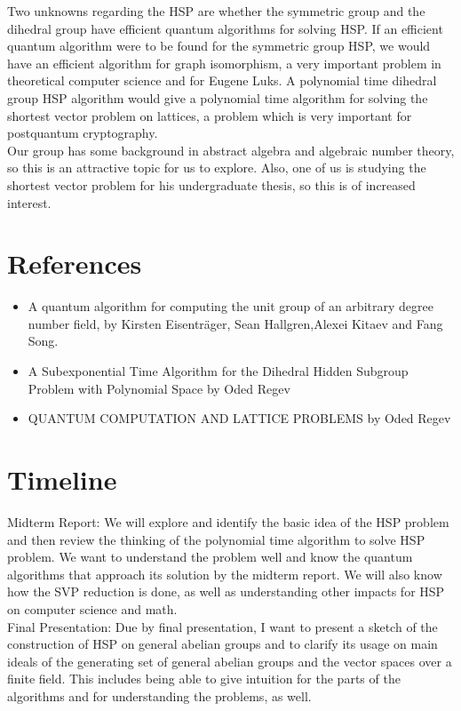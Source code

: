 \documentclass[dvips,12pt]{article}
\theoremstyle{plain}
\theoremstyle{definition}
\begin{document}
Two unknowns regarding the HSP are whether the symmetric group and the dihedral group have efficient quantum algorithms for solving HSP. If an efficient quantum algorithm were to be found for the symmetric group HSP, we would have an efficient algorithm for graph isomorphism, a very important problem in theoretical computer science and for Eugene Luks. A polynomial time dihedral group HSP algorithm would give a polynomial time algorithm for solving the shortest vector problem on lattices, a problem which is very important for postquantum cryptography.\\

Our group has some background in abstract algebra and algebraic number theory, so this is an attractive topic for us to explore. Also, one of us is studying the shortest vector problem for his undergraduate thesis, so this is of increased interest.\\

\section{References}
\begin{itemize}
\item A quantum algorithm for computing the unit group of an
arbitrary degree number field, by Kirsten Eisenträger, Sean Hallgren,Alexei Kitaev and Fang Song.
	
\item A Subexponential Time Algorithm for the Dihedral Hidden Subgroup Problem with Polynomial Space                                        by Oded Regev
	
	
\item QUANTUM COMPUTATION AND LATTICE PROBLEMS by Oded Regev 
	
\end{itemize}


\section{Timeline}
Midterm Report: We will explore and identify the basic idea of the HSP problem and then review the thinking of the polynomial time algorithm to solve HSP problem. We want to understand the problem well and know the quantum algorithms that approach its solution by the midterm report. We will also know how the SVP reduction is done, as well as understanding other impacts for HSP on computer science and math.\\
Final Presentation: Due by final presentation, I want to present a sketch of the construction of HSP on general abelian groups and to clarify its usage on main ideals of the generating set of general abelian groups and the vector spaces over a finite field. This includes being able to give intuition for the parts of the algorithms and for understanding the problems, as well.\\
	
\end{document}
